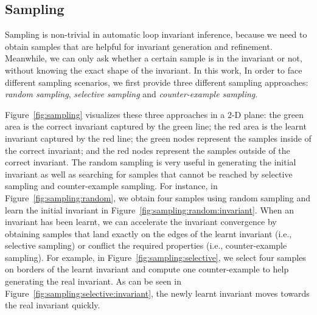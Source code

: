 \subsection{Sampling} %
\label{sub:sampling_approaches}

Sampling is non-trivial in automatic loop invariant inference, 
because we need to obtain samples that are helpful for invariant generation and refinement. 
Meanwhile, we can only ask whether a certain sample is in the invariant or not, 
without knowing the exact shape of the invariant. 
In this work, In order to face different sampling scenarios, 
we first provide three different sampling approaches:
\emph{random sampling}, \emph{selective sampling} and \emph{counter-example sampling}. 

Figure~\ref{fig:sampling} visualizes these three approaches in a 2-D plane: 
the green area is the correct invariant captured by the green line; 
the red area is the learnt invariant captured by the red line; 
the green nodes represent the samples inside of the correct invariant; 
and the red nodes represent the samples outside of the correct invariant. 
The random sampling is very useful in generating the initial invariant 
as well as searching for samples that cannot be reached 
by selective sampling and counter-example sampling. 
For instance, in Figure~\ref{fig:sampling:random}, 
we obtain four samples using random sampling 
and learn the initial invariant in Figure~\ref{fig:sampling:random:invariant}. 
When an invariant has been learnt, 
we can accelerate the invariant convergence by obtaining samples that 
land exactly on the edges of the learnt invariant (i.e., selective sampling) 
or conflict the required properties (i.e., counter-example sampling). 
For example, in Figure~\ref{fig:sampling:selective}, 
we select four samples on borders of the learnt invariant and 
compute one counter-example to help generating the real invariant. 
As can be seen in Figure~\ref{fig:sampling:selective:invariant}, 
the newly learnt invariant moves towards the real invariant quickly. 

